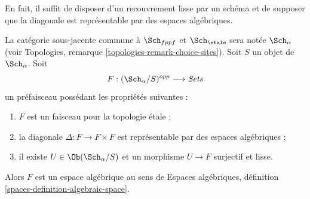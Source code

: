 \noindent
En fait, il suffit de disposer d'un recouvrement lisse par un schéma et de supposer
que la diagonale est représentable par des espaces algébriques.

\begin{lemma}
\label{lemma-spaces-etale-smooth-cover}
La catégorie sous-jacente commune à $\Sch_{fppf}$
et $\Sch_\etale$ sera notée $\Sch_\alpha$ (voir
Topologies, remarque \ref{topologies-remark-choice-sites}). Soit $S$ un objet
de $\Sch_\alpha$. Soit
$$
F : (\Sch_\alpha/S)^{opp} \longrightarrow \textit{Sets}
$$
un préfaisceau possédant les propriétés suivantes :
\begin{enumerate}
\item $F$ est un faisceau pour la topologie étale ;
\item la diagonale $\Delta : F \to F \times F$ est représentable
par des espaces algébriques ;
\item il existe $U \in \Ob(\Sch_\alpha/S)$
et un morphisme $U \to F$ surjectif et lisse.
\end{enumerate}
Alors $F$ est un espace algébrique au sens de
Espaces algébriques, définition \ref{spaces-definition-algebraic-space}.
\end{lemma}

